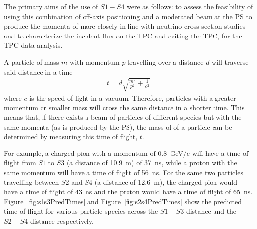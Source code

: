 The primary aims of the use of $\mathit{S1} - \mathit{S4}$ were as follows: to assess the feasibility of using this combination of off-axis positioning and a moderated beam at the PS to produce the momenta of more closely in line with neutrino cross-section studies and to characterize the incident flux on the TPC and exiting the TPC, for the TPC data analysis. 


A particle of mass $m$ with momentum $p$ travelling over a distance $d$ will traverse said distance in a time
\begin{align}
	t = d \sqrt{\frac{m^2}{p^2} + \frac{1}{c^2}}
\end{align}
where $c$ is the speed of light in a vacuum.
Therefore, particles with a greater momentum or smaller mass will cross the same distance in a shorter time.
This means that, if there exists a beam of particles of different species but with the same momenta (as is produced by the PS), the mass of of a particle can be determined by measuring this time of flight, $t$.

For example, a charged pion with a momentum of 0.8~GeV/c will have a time of flight from $\mathit{S1}$ to $\mathit{S3}$ (a distance of 10.9~m) of 37~ns, while a proton with the same momentum will have a time of flight of 56~ns.
For the same two particles travelling between $\mathit{S2}$ and $\mathit{S4}$ (a distance of 12.6~m), the charged pion would have a time of flight of 43~ns and the proton would have a time of flight of 65~ns.
Figure~\ref{fig:s1s3PredTimes} and Figure~\ref{fig:s2s4PredTimes} show the predicted time of flight for various particle species across the $\mathit{S1}-\mathit{S3}$ distance and the $\mathit{S2}-\mathit{S4}$ distance respectively.

